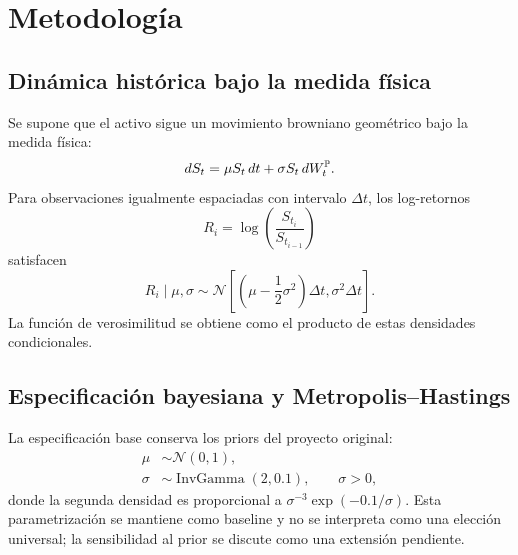 \section{Metodología}

\subsection{Dinámica histórica bajo la medida física}

Se supone que el activo sigue un movimiento browniano geométrico bajo la medida física:
\begin{equation}
 dS_t=\mu S_t\,dt+\sigma S_t\,dW_t^{\mathbb{P}}.
 \label{eq:p_gbm}
\end{equation}
Para observaciones igualmente espaciadas con intervalo $\Delta t$, los log-retornos
\begin{equation}
 R_i=\log\left(\frac{S_{t_i}}{S_{t_{i-1}}}\right)
\end{equation}
satisfacen
\begin{equation}
 R_i\mid\mu,\sigma
 \sim
 \mathcal N\!\left[
 \left(\mu-\frac12\sigma^2\right)\Delta t,
 \sigma^2\Delta t
 \right].
 \label{eq:return_likelihood}
\end{equation}
La función de verosimilitud se obtiene como el producto de estas densidades condicionales.

\subsection{Especificación bayesiana y Metropolis--Hastings}

La especificación base conserva los priors del proyecto original:
\begin{align}
 \mu &\sim \mathcal N(0,1),\\
 \sigma &\sim \operatorname{InvGamma}(2,0.1), \qquad \sigma>0,
 \label{eq:priors}
\end{align}
donde la segunda densidad es proporcional a $\sigma^{-3}\exp(-0.1/\sigma)$. Esta parametrización se mantiene como baseline y no se interpreta como una elección universal; la sensibilidad al prior se discute como una extensión pendiente.

